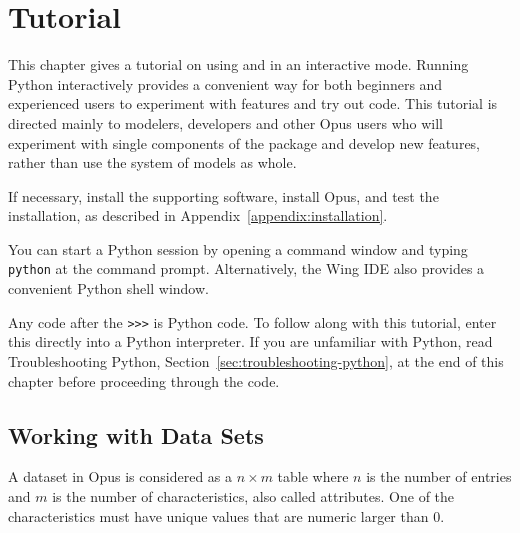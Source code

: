 
\chapter{Tutorial}
\label{urbansim-tutorial}

This chapter gives a tutorial on using  and  in an interactive mode.
Running Python \pythonindex interactively provides a convenient way for both beginners
and experienced users to experiment with features and try out code.  This
tutorial is directed mainly to modelers, developers and other Opus users
who will experiment with single components of the package and develop new
features, rather than use the system of models as whole.

If necessary, install the supporting software, install Opus, and test
the installation, as described in Appendix~\ref{appendix:installation}.

You can start a Python session by opening a command window and
typing \verb|python| at the command prompt. Alternatively, the
Wing IDE \wingindex also provides a convenient Python shell window.

Any code after the \verb|>>>| is Python code.  To follow along with this
tutorial, enter this directly into a Python interpreter.  If you are unfamiliar
with Python, read Troubleshooting Python,
Section~\ref{sec:troubleshooting-python}, at the end of this chapter before
proceeding through the code.

\section{Working with Data Sets}
\label{sec:datasets}

A dataset \datasetindex in Opus is considered as a $n \times m$ table where $n$ is the
number of entries and $m$ is the number of characteristics, \characteristicsindex also called
attributes. \attributesindex One of the characteristics \characteristicsindex must have unique values
that are numeric larger than 0.

